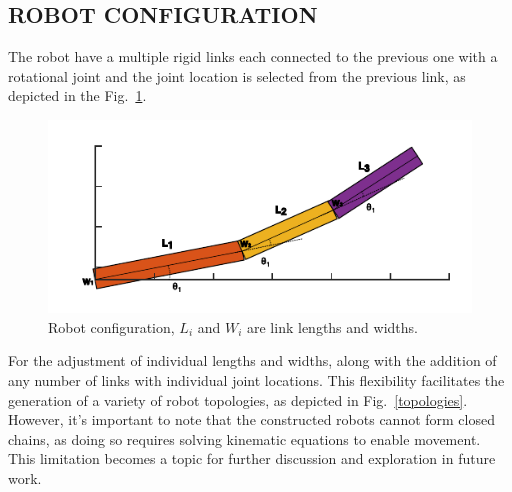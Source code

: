 \documentclass{IEEEtaes}
\begin{document}

\subsection{{\fontsize{11}{10}\selectfont R}OBOT CONFIGURATION}

The robot have a multiple rigid links each connected to the previous one with a rotational joint and the joint location is selected from the previous link, as depicted in the Fig.~\ref{robot}.

\begin{figure}[h!]
    \begin{center}
        \includegraphics[width=0.85\linewidth]{figures/ROBOT.pdf}
     \end{center}
     \caption{Robot configuration, $L_i$ and $W_i$ are link lengths and widths.}
     \label{robot}
\end{figure}

For the adjustment of individual lengths and widths, along with the addition of any number of links with individual joint locations. This flexibility facilitates the generation of a variety of robot topologies, as depicted in Fig.~\ref{topologies}. However, it's important to note that the constructed robots cannot form closed chains, as doing so requires solving kinematic equations to enable movement. This limitation becomes a topic for further discussion and exploration in future work.
\end{document}
